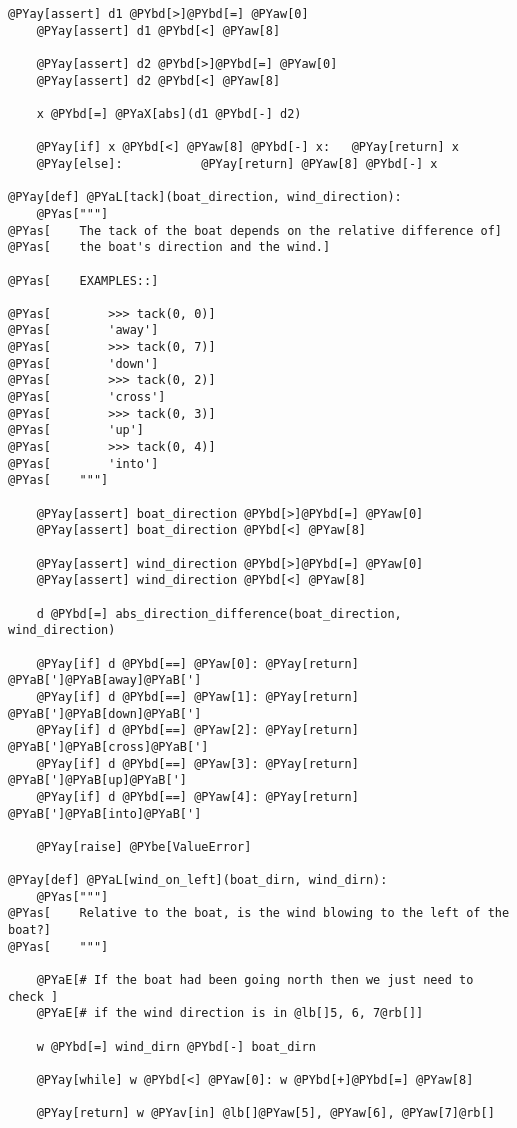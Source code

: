 \begin{Verbatim}[commandchars=@\[\]]
    @PYay[assert] d1 @PYbd[>]@PYbd[=] @PYaw[0]
    @PYay[assert] d1 @PYbd[<] @PYaw[8]

    @PYay[assert] d2 @PYbd[>]@PYbd[=] @PYaw[0]
    @PYay[assert] d2 @PYbd[<] @PYaw[8]

    x @PYbd[=] @PYaX[abs](d1 @PYbd[-] d2)

    @PYay[if] x @PYbd[<] @PYaw[8] @PYbd[-] x:   @PYay[return] x
    @PYay[else]:           @PYay[return] @PYaw[8] @PYbd[-] x

@PYay[def] @PYaL[tack](boat_direction, wind_direction):
    @PYas["""]
@PYas[    The tack of the boat depends on the relative difference of]
@PYas[    the boat's direction and the wind.]

@PYas[    EXAMPLES::]

@PYas[        >>> tack(0, 0)]
@PYas[        'away']
@PYas[        >>> tack(0, 7)]
@PYas[        'down']
@PYas[        >>> tack(0, 2)]
@PYas[        'cross']
@PYas[        >>> tack(0, 3)]
@PYas[        'up']
@PYas[        >>> tack(0, 4)]
@PYas[        'into']
@PYas[    """]

    @PYay[assert] boat_direction @PYbd[>]@PYbd[=] @PYaw[0]
    @PYay[assert] boat_direction @PYbd[<] @PYaw[8]

    @PYay[assert] wind_direction @PYbd[>]@PYbd[=] @PYaw[0]
    @PYay[assert] wind_direction @PYbd[<] @PYaw[8]

    d @PYbd[=] abs_direction_difference(boat_direction, wind_direction)

    @PYay[if] d @PYbd[==] @PYaw[0]: @PYay[return] @PYaB[']@PYaB[away]@PYaB[']
    @PYay[if] d @PYbd[==] @PYaw[1]: @PYay[return] @PYaB[']@PYaB[down]@PYaB[']
    @PYay[if] d @PYbd[==] @PYaw[2]: @PYay[return] @PYaB[']@PYaB[cross]@PYaB[']
    @PYay[if] d @PYbd[==] @PYaw[3]: @PYay[return] @PYaB[']@PYaB[up]@PYaB[']
    @PYay[if] d @PYbd[==] @PYaw[4]: @PYay[return] @PYaB[']@PYaB[into]@PYaB[']

    @PYay[raise] @PYbe[ValueError]

@PYay[def] @PYaL[wind_on_left](boat_dirn, wind_dirn):
    @PYas["""]
@PYas[    Relative to the boat, is the wind blowing to the left of the boat?]
@PYas[    """]

    @PYaE[# If the boat had been going north then we just need to check ]
    @PYaE[# if the wind direction is in @lb[]5, 6, 7@rb[]]

    w @PYbd[=] wind_dirn @PYbd[-] boat_dirn

    @PYay[while] w @PYbd[<] @PYaw[0]: w @PYbd[+]@PYbd[=] @PYaw[8]

    @PYay[return] w @PYav[in] @lb[]@PYaw[5], @PYaw[6], @PYaw[7]@rb[]


\end{Verbatim}
